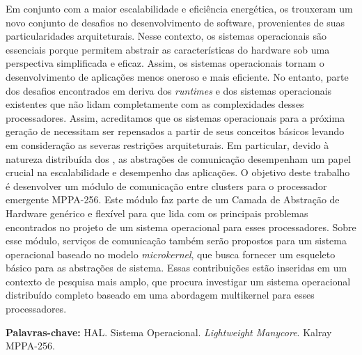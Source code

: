 
\begin{resumo}[Resumo]
	Em conjunto com a maior escalabilidade e eficiência energética,
	os \lightweight \manycores trouxeram um novo conjunto de desafios no
	desenvolvimento de software, provenientes de suas particularidades arquiteturais.
	Nesse contexto, os sistemas operacionais são essenciais porque permitem abstrair
	as características do hardware sob uma perspectiva simplificada e eficaz.
	Assim, os sistemas operacionais tornam o desenvolvimento de aplicações
	menos oneroso e mais eficiente.
	No entanto, parte dos desafios encontrados em \lightweight \manycores
	deriva dos \textit{runtimes} e dos sistemas operacionais existentes que não
	lidam completamente com as complexidades desses processadores.
	Assim, acreditamos que os sistemas operacionais para a próxima geração de
	\lightweight \manycores necessitam ser repensados a partir de seus conceitos
	básicos levando em consideração as severas restrições arquiteturais.
	Em particular, devido à natureza distribuída dos \manycores, as
	abstrações de comunicação desempenham um papel crucial na escalabilidade
	e desempenho das aplicações.
	O objetivo deste trabalho é desenvolver um módulo de comunicação
	entre clusters para o processador \manycore emergente MPPA-256.
	Este módulo faz parte de um Camada de Abstração de Hardware genérico e
	flexível para \lightweight \manycores que lida com os principais
	problemas encontrados no projeto de um sistema operacional para esses processadores.
	Sobre esse módulo, serviços de comunicação também serão propostos para
	um sistema operacional baseado no modelo \textit{microkernel}, que busca
	fornecer um esqueleto básico para as abstrações de sistema.
	Essas contribuições estão inseridas em um contexto de pesquisa mais amplo,
	que procura investigar um sistema operacional distribuído completo baseado
	em uma abordagem multikernel para esses processadores.

	\vspace{\baselineskip}
	\textbf{Palavras-chave:} HAL. Sistema Operacional. \textit{Lightweight Manycore}. Kalray MPPA-256.
\end{resumo}

